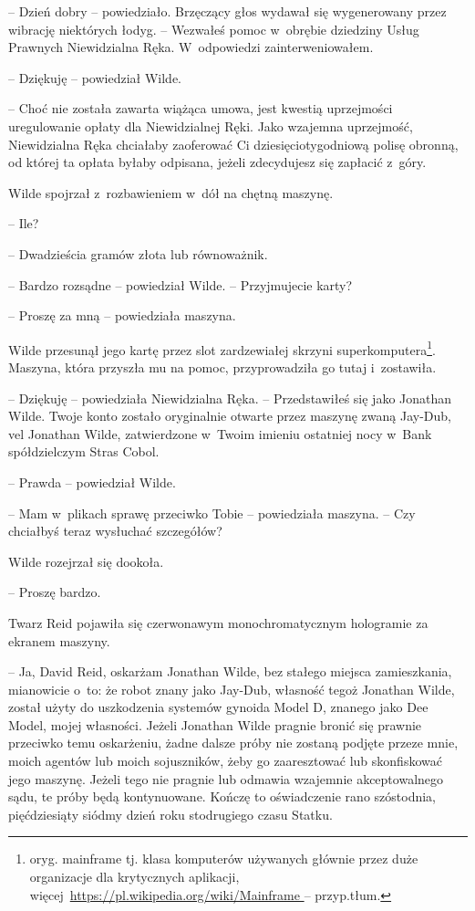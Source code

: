 \documentclass[oneside,polish,11pt,sfheadings]{mwbk}
\begin{document}
-- Dzień dobry -- powiedziało. Brzęczący głos wydawał się wygenerowany
przez wibrację niektórych łodyg. -- Wezwałeś pomoc w~obrębie dziedziny
Usług Prawnych Niewidzialna Ręka. W~odpowiedzi zainterweniowałem.

-- Dziękuję -- powiedział Wilde.

-- Choć nie została zawarta wiążąca umowa, jest kwestią uprzejmości
uregulowanie opłaty dla Niewidzialnej Ręki. Jako wzajemna uprzejmość,
Niewidzialna Ręka chciałaby zaoferować Ci dziesięciotygodniową polisę
obronną, od której ta opłata byłaby odpisana, jeżeli zdecydujesz się
zapłacić z~góry.

Wilde spojrzał z~rozbawieniem w~dół na chętną maszynę.

-- Ile?

-- Dwadzieścia gramów złota lub równoważnik.

-- Bardzo rozsądne -- powiedział Wilde. -- Przyjmujecie karty?

-- Proszę za mną -- powiedziała maszyna.

Wilde przesunął jego kartę przez slot zardzewiałej skrzyni
superkomputera\footnote{oryg. mainframe tj. klasa komputerów używanych
głównie przez duże organizacje dla krytycznych aplikacji,
więcej~\url{https://pl.wikipedia.org/wiki/Mainframe } -- przyp.tłum.}. Maszyna, która przyszła mu na pomoc, przyprowadziła go
tutaj i~zostawiła.

-- Dziękuję -- powiedziała Niewidzialna Ręka. -- Przedstawiłeś się jako
Jonathan Wilde. Twoje konto zostało oryginalnie otwarte przez maszynę
zwaną Jay-Dub, vel Jonathan Wilde, zatwierdzone w~Twoim imieniu
ostatniej nocy w~Bank spółdzielczym Stras Cobol.

-- Prawda -- powiedział Wilde.

-- Mam w~plikach sprawę przeciwko Tobie -- powiedziała maszyna. -- Czy
chciałbyś teraz wysłuchać szczegółów?

Wilde rozejrzał się dookoła.

-- Proszę bardzo.

Twarz Reid pojawiła się czerwonawym monochromatycznym hologramie za
ekranem maszyny.

-- Ja, David Reid, oskarżam Jonathan Wilde, bez stałego miejsca
zamieszkania, mianowicie o~to: że robot znany jako Jay-Dub, własność
tegoż Jonathan Wilde, został użyty do uszkodzenia systemów gynoida Model
D, znanego jako Dee Model, mojej własności. Jeżeli Jonathan Wilde
pragnie bronić się prawnie przeciwko temu oskarżeniu, żadne dalsze próby
nie zostaną podjęte przeze mnie, moich agentów lub moich sojuszników,
żeby go zaaresztować lub skonfiskować jego maszynę. Jeżeli tego nie
pragnie lub odmawia wzajemnie akceptowalnego sądu, te próby będą
kontynuowane. Kończę to oświadczenie rano szóstodnia, pięćdziesiąty
siódmy dzień roku stodrugiego czasu Statku.
\end{document}
